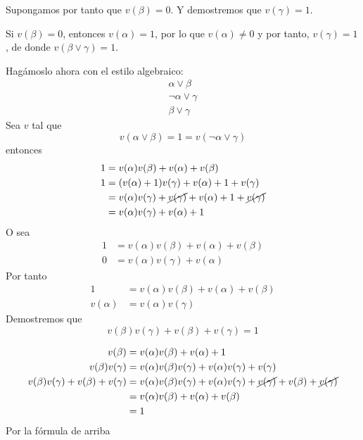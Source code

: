 \begin{ejercicio*}
\begin{enumerate}
\begin{itemize}
                Supongamos por tanto que $v(\beta)=0$. Y demostremos que $v(\gamma)=1$.

                Si $v(\beta)=0$, entonces $v(\alpha)=1$, por lo que $v(\alpha)\neq 0$ y por tanto, $v(\gamma)=1$, de donde $v(\beta\lor\gamma)=1$.
        \end{itemize}

        Hagámoslo ahora con el estilo algebraico:
        \begin{equation*}
            \begin{array}{c}
                \alpha\lor\beta \\
                \lnot\alpha\lor\gamma \\
                \hline
                \beta\lor\gamma
            \end{array}
        \end{equation*}
        Sea $v$ tal que
        \begin{equation*}
            v(\alpha\lor\beta)=1=v(\lnot\alpha\lor\gamma)
        \end{equation*}
        entonces
        \begin{align*}
            1 &= v(\alpha)v(\beta)+v(\alpha)+v(\beta) \\
            1 &= (v(\alpha)+1)v(\gamma) + v(\alpha) + 1 + v(\gamma) \\
              &= v(\alpha)v(\gamma)+\cancel{v(\gamma)}+v(\alpha)+1+\cancel{v(\gamma)} \\
              &= v(\alpha)v(\gamma)+v(\alpha)+1
        \end{align*}
        O sea
        \begin{align*}
            1 &= v(\alpha)v(\beta) + v(\alpha) + v(\beta) \\
            0 &= v(\alpha)v(\gamma)+v(\alpha)
        \end{align*}
        Por tanto
        \begin{align*}
            1 &= v(\alpha)v(\beta) + v(\alpha) + v(\beta) \\
            v(\alpha) &= v(\alpha)v(\gamma)
        \end{align*}
        Demostremos que 
        \begin{equation*}
            v(\beta)v(\gamma)+v(\beta)+v(\gamma) = 1
        \end{equation*}

        \begin{align*}
            v(\beta) &= v(\alpha)v(\beta)+v(\alpha)+1 \\
            v(\beta)v(\gamma) &= v(\alpha)v(\beta)v(\gamma) + v(\alpha)v(\gamma) + v(\gamma) \\
            v(\beta)v(\gamma) + v(\beta) + v(\gamma) &= v(\alpha)v(\beta)v(\gamma) + v(\alpha)v(\gamma) + \cancel{v(\gamma)} + v(\beta) + \cancel{v(\gamma)} \\
                                                     &= v(\alpha)v(\beta) + v(\alpha) + v(\beta) \\
                                                     &= 1
        \end{align*}
        Por la fórmula de arriba


\end{enumerate}
\end{ejercicio*}
